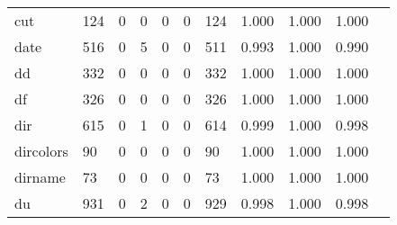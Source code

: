 \begin{longtable}{lp{1.10cm}p{1.10cm}p{1.10cm}p{1.10cm}p{1.10cm}p{1.10cm}p{1.10cm}p{1.10cm}p{1.10cm}p{1.10cm}}
cut       &                    124 &                                  0 &                                 0 &                                0 &                                 0 &                             124 &                          1.000 &                                 1.000 &                               1.000 \\
date      &                    516 &                                  0 &                                 5 &                                0 &                                 0 &                             511 &                          0.993 &                                 1.000 &                               0.990 \\
dd        &                    332 &                                  0 &                                 0 &                                0 &                                 0 &                             332 &                          1.000 &                                 1.000 &                               1.000 \\
df        &                    326 &                                  0 &                                 0 &                                0 &                                 0 &                             326 &                          1.000 &                                 1.000 &                               1.000 \\
dir       &                    615 &                                  0 &                                 1 &                                0 &                                 0 &                             614 &                          0.999 &                                 1.000 &                               0.998 \\
dircolors &                     90 &                                  0 &                                 0 &                                0 &                                 0 &                              90 &                          1.000 &                                 1.000 &                               1.000 \\
dirname   &                     73 &                                  0 &                                 0 &                                0 &                                 0 &                              73 &                          1.000 &                                 1.000 &                               1.000 \\
du        &                    931 &                                  0 &                                 2 &                                0 &                                 0 &                             929 &                          0.998 &                                 1.000 &                               0.998 \\

\end{longtable}
